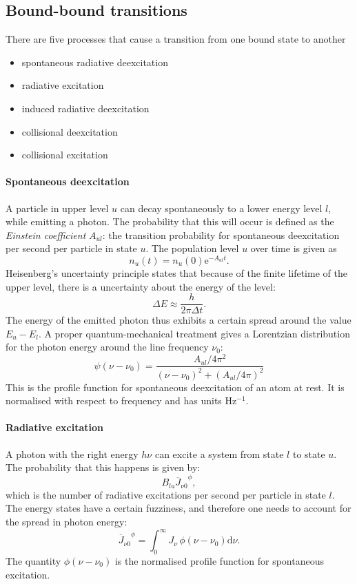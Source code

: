 \documentclass[12pt]{article}
\numberwithin{equation}{section}
\def\exp{\mathrm{e}}
\def\dd{\mathrm{d}}
\def\Jnu{\ensuremath{J_{\nu}}}
\def\Jbar{\ensuremath{\overline{J}_{\nu0}}}
\newcommand{\be}{\begin{equation}}
\newcommand{\ee}{\end{equation}}
\begin{document}
\subsection{Bound-bound transitions}

There are five processes that cause a transition from one bound state to another
\begin{itemize}
\item spontaneous radiative deexcitation
\item radiative excitation
\item induced radiative deexcitation
\item collisional deexcitation
\item collisional excitation
\end{itemize}

\paragraph{Spontaneous  deexcitation}
A particle in upper level $u$ can decay spontaneously to a lower energy level $l$, while emitting a photon. The probability that this will occur is defined as the {\it Einstein coefficient} $A_{ul}$: the transition probability for spontaneous deexcitation per second per particle in state $u$. The population level $u$ over time is given as
\be
n_u(t) = n_u(0) \exp^{-A_{ul}t}.
\ee
Heisenberg's uncertainty principle states that because of the finite lifetime of the upper level, there is a uncertainty about the energy of the level:
\be
\Delta E \approx \frac{h}{2 \pi \Delta t}.
\ee
The energy of the emitted photon thus exhibits a certain spread around the value $E_u-E_l$. A proper quantum-mechanical treatment gives a Lorentzian distribution for the photon energy around the line frequency $\nu_0$:
\be
\psi(\nu-\nu_0) = \frac{A_{ul}/ 4 \pi^2}{(\nu-\nu_0)^2 + (A_{ul}/4 \pi)^2}
\ee
This is the profile function for spontaneous deexcitation of an atom at rest. It is normalised with respect to frequency and has units Hz$^{-1}$.

\paragraph{Radiative excitation} A photon with the right energy $h\nu$ can excite a system from state $l$ to state $u$. The probability that this happens is given by:
\be
B_{lu} \Jbar^\phi,
\ee
which is the number of radiative excitations per second per particle in state $l$. The energy states have a certain fuzziness, and therefore one needs to account for the spread in photon energy:
\be
\Jbar^\phi = \int_0^\infty \Jnu \, \phi (\nu-\nu_0) \dd \nu.
\ee
The quantity $\phi (\nu-\nu_0)$ is the normalised profile function for spontaneous excitation.
\end{document}
